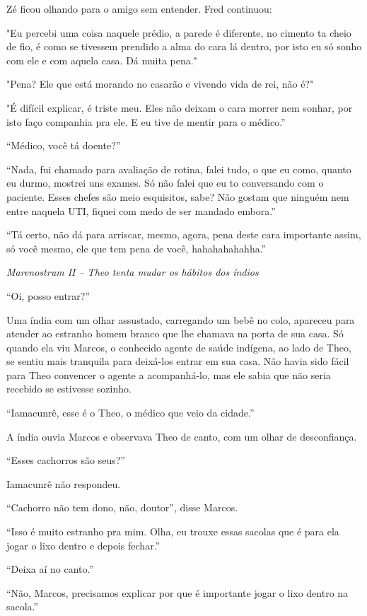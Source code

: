 Zé ficou olhando para o amigo sem entender. Fred continuou:

"Eu percebi uma coisa naquele prédio, a parede é diferente, no cimento
ta cheio de fio, é como se tivessem prendido a alma do cara lá dentro,
por isto eu só sonho com ele e com aquela casa. Dá muita pena."

"Pena? Ele que está morando no casarão e vivendo vida de rei, não é?"

"É difícil explicar, é triste meu. Eles não deixam o cara morrer nem
sonhar, por isto faço companhia pra ele. E eu tive de mentir para o
médico.''

``Médico, você tá doente?''

``Nada, fui chamado para avaliação de rotina, falei tudo, o que eu como,
quanto eu durmo, mostrei uns exames. Só não falei que eu to conversando
com o paciente. Esses chefes são meio esquisitos, sabe? Não gostam que
ninguém nem entre naquela UTI, fiquei com medo de ser mandado embora.''

``Tá certo, não dá para arriscar, mesmo, agora, pena deste cara
importante assim, só você mesmo, ele que tem pena de você,
hahahahahahha.''

\asterisc

\emph{Marenostrum II -- Theo tenta mudar os hábitos dos índios}

``Oi, posso entrar?''

Uma índia com um olhar assustado, carregando um bebê no colo, apareceu
para atender ao estranho homem branco que lhe chamava na porta de sua
casa. Só quando ela viu Marcos, o conhecido agente de saúde indígena, ao
lado de Theo, se sentiu mais tranquila para deixá-los entrar em sua
casa. Não havia sido fácil para Theo convencer o agente a acompanhá-lo,
mas ele sabia que não seria recebido se estivesse sozinho.

``Iamacunrê, esse é o Theo, o médico que veio da cidade.''

A índia ouvia Marcos e observava Theo de canto, com um olhar de
desconfiança.

``Esses cachorros são seus?''

Iamacunrê não respondeu.

``Cachorro não tem dono, não, doutor'', disse Marcos.

``Isso é muito estranho pra mim. Olha, eu trouxe essas sacolas que é
para ela jogar o lixo dentro e depois fechar.''

``Deixa aí no canto.''

``Não, Marcos, precisamos explicar por que é importante jogar o lixo
dentro na sacola.''

